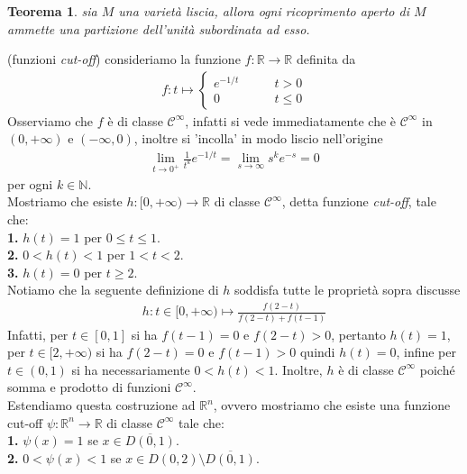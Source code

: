 \documentclass[oneside, 11pt]{amsbook}
\makeatletter
\newcommand{\C}{\mathcal{C}}
\newcommand{\R}{\mathbb{R}}
\newcommand{\co}[1]{\textit{#1}}
\newcommand{\gr}[1]{\textbf{#1}}
\newcommand{\N}{{\mathbb N}}
\newcommand{\0}{{(0)}}
\newcommand{\3}{{(3)}}
\theoremstyle{colonplain}
\newtheorem{thm}{Teorema}[chapter]
\theoremstyle{colondefinition}
\theoremstyle{colonremark}
\numberwithin{equation}{chapter}
\renewcommand{\proofname}{Dimostrazione}
\renewenvironment{proof}[1][\proofname]{\par
  \pushQED{\qed}%
  \normalfont \topsep6\p@\@plus6\p@\relax
  \trivlist
  \item[\hskip\labelsep\bfseries #1:]\ignorespaces
}{%
  \popQED\endtrivlist\@endpefalse
}
\makeatother
\begin{document}
\begin{thm}\label{PartOfUnity}
    sia $M$ una varietà liscia, allora ogni ricoprimento aperto di $M$ ammette una partizione dell'unità subordinata ad esso.
\end{thm}
\begin{proof}
    (funzioni \co{cut-off}) consideriamo la funzione $f : \R \longrightarrow \R$ definita da
    \begin{align}
        f : t \mapsto \begin{cases}
            e^{-1/t} &\qquad t > 0 \\
            0 &\qquad t \leq 0
        \end{cases}
    \end{align}
    Osserviamo che $f$ è di classe $\C^\infty$, infatti si vede immediatamente che è $\C^\infty$ in $(0, +\infty)$ e $(-\infty, 0)$, inoltre si 'incolla' in modo liscio nell'origine
    \begin{align}
        \lim_{t \rightarrow 0^+} \frac{1}{t^k}e^{-1/t} = \lim_{s \rightarrow \infty} s^ke^{-s} = 0
    \end{align}
    per ogni $k \in \N$. \\
    Mostriamo che esiste $h : [0, +\infty) \longrightarrow \R$ di classe $\C^\infty$, detta funzione \co{cut-off}, tale che: \\
    \gr{1.} $h(t) = 1$ per $0 \leq t \leq 1$. \\
    \gr{2.} $0 < h(t) < 1$ per $1 < t < 2$. \\
    \gr{3.} $h(t) = 0$ per $t \geq 2$. \\
    Notiamo che la seguente definizione di $h$ soddisfa tutte le proprietà sopra discusse
    \begin{align}
        h : t \in [0, +\infty) \mapsto \frac{f(2 - t)}{f(2 - t) + f(t - 1)}
    \end{align}
    Infatti, per $t \in [0, 1]$ si ha $f(t - 1) = 0$ e $f(2 - t) > 0$, pertanto $h(t) = 1$, per $t \in [2, +\infty)$ si ha $f(2 - t) = 0$ e $f(t - 1) > 0$ quindi $h(t) = 0$, infine per $t \in (0, 1)$ si ha necessariamente $0 < h(t) < 1$. Inoltre, $h$ è di classe $\C^\infty$ poiché somma e prodotto di funzioni $\C^\infty$. \\
    Estendiamo questa costruzione ad $\R^n$, ovvero mostriamo che esiste una funzione cut-off $\psi : \R^n \longrightarrow \R$ di classe $\C^\infty$ tale che: \\
    \gr{1.} $\psi(x) = 1$ se $x \in \overline{D(0, 1)}$. \\
    \gr{2.} $0 < \psi(x) < 1$ se $x \in D(0, 2) \setminus \overline{D(0, 1)}$. \\

\end{proof}
\end{document}
